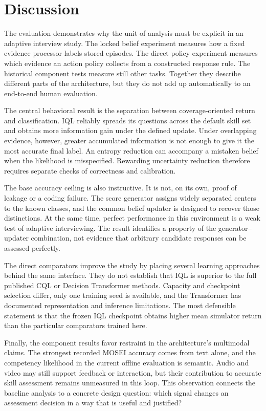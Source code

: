 \documentclass[10pt,a4paper]{article}
\begin{document}
\section{Discussion}
The evaluation demonstrates why the unit of analysis must be explicit in an adaptive interview study. The locked belief experiment measures how a fixed evidence processor labels stored episodes. The direct policy experiment measures which evidence an action policy collects from a constructed response rule. The historical component tests measure still other tasks. Together they describe different parts of the architecture, but they do not add up automatically to an end-to-end human evaluation.

The central behavioral result is the separation between coverage-oriented return and classification. IQL reliably spreads its questions across the default skill set and obtains more information gain under the defined update. Under overlapping evidence, however, greater accumulated information is not enough to give it the most accurate final label. An entropy reduction can accompany a mistaken belief when the likelihood is misspecified. Rewarding uncertainty reduction therefore requires separate checks of correctness and calibration.

The base accuracy ceiling is also instructive. It is not, on its own, proof of leakage or a coding failure. The score generator assigns widely separated centers to the known classes, and the common belief updater is designed to recover those distinctions. At the same time, perfect performance in this environment is a weak test of adaptive interviewing. The result identifies a property of the generator--updater combination, not evidence that arbitrary candidate responses can be assessed perfectly.

The direct comparators improve the study by placing several learning approaches behind the same interface. They do not establish that IQL is superior to the full published CQL or Decision Transformer methods. Capacity and checkpoint selection differ, only one training seed is available, and the Transformer has documented representation and inference limitations. The most defensible statement is that the frozen IQL checkpoint obtains higher mean simulator return than the particular comparators trained here.

Finally, the component results favor restraint in the architecture's multimodal claims. The strongest recorded MOSEI accuracy comes from text alone, and the competency likelihood in the current offline evaluation is semantic. Audio and video may still support feedback or interaction, but their contribution to accurate skill assessment remains unmeasured in this loop. This observation connects the baseline analysis to a concrete design question: which signal changes an assessment decision in a way that is useful and justified?
\end{document}
